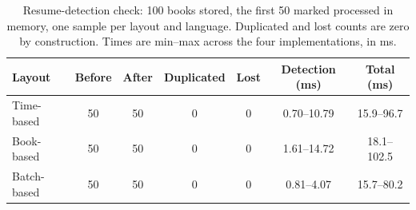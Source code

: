 \begin{table}[htbp]
    \centering
    \caption{Resume-detection check: 100 books stored, the first 50 marked
    processed in memory, one sample per layout and language. Duplicated and
    lost counts are zero by construction. Times are min--max across the four
    implementations, in ms.}
    \label{tab:recovery}
    \begin{tabular}{@{}lcccccc@{}}
        \toprule
        Layout & Before & After & Duplicated & Lost & Detection (ms) & Total (ms) \\
        \midrule
        Time-based & 50 & 50 & 0 & 0 & 0.70--10.79 & 15.9--96.7 \\
        Book-based & 50 & 50 & 0 & 0 & 1.61--14.72 & 18.1--102.5 \\
        Batch-based & 50 & 50 & 0 & 0 & 0.81--4.07 & 15.7--80.2 \\
        \bottomrule
    \end{tabular}
\end{table}
